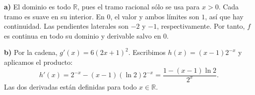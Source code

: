 \textbf{a)} El dominio es todo $\mathbb R$, pues el tramo racional sólo se usa para $x>0$. Cada tramo es suave en su interior. En $0$, el valor y ambos límites son $1$, así que hay continuidad. Las pendientes laterales son $-2$ y $-1$, respectivamente. Por tanto, $f$ es continua en todo su dominio y derivable salvo en $0$.

\textbf{b)} Por la cadena, $g'(x)=6(2x+1)^2$. Escribimos $h(x)=(x-1)2^{-x}$ y aplicamos el producto:
\[
h'(x)=2^{-x}-(x-1)(\ln2)2^{-x}
=\frac{1-(x-1)\ln2}{2^x}.
\]
Las dos derivadas están definidas para todo $x\in\mathbb R$.
